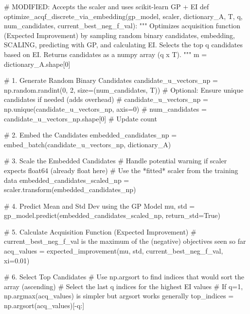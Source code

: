 \documentclass[
  letterpaper,
  DIV=11,
  numbers=noendperiod]{scrartcl}
\newenvironment{Shaded}{\begin{snugshade}}{\end{snugshade}}
\newcommand{\CommentTok}[1]{\textcolor[rgb]{0.37,0.37,0.37}{#1}}
\newcommand{\DecValTok}[1]{\textcolor[rgb]{0.68,0.00,0.00}{#1}}
\newcommand{\FloatTok}[1]{\textcolor[rgb]{0.68,0.00,0.00}{#1}}
\newcommand{\KeywordTok}[1]{\textcolor[rgb]{0.00,0.23,0.31}{#1}}
\newcommand{\NormalTok}[1]{\textcolor[rgb]{0.00,0.23,0.31}{#1}}
\newcommand{\OperatorTok}[1]{\textcolor[rgb]{0.37,0.37,0.37}{#1}}
\newcommand{\VariableTok}[1]{\textcolor[rgb]{0.07,0.07,0.07}{#1}}
\begin{document}
\begin{Shaded}
\begin{Highlighting}[]
\CommentTok{\# MODIFIED: Accepts the scaler and uses scikit{-}learn GP + EI}
\KeywordTok{def}\NormalTok{ optimize\_acqf\_discrete\_via\_embedding(gp\_model, scaler, dictionary\_A, T, q, num\_candidates, current\_best\_neg\_f\_val):}
    \CommentTok{"""}
\CommentTok{    Optimizes acquisition function (Expected Improvement) by sampling random}
\CommentTok{    binary candidates, embedding, SCALING, predicting with GP, and calculating EI.}
\CommentTok{    Selects the top q candidates based on EI.}
\CommentTok{    Returns candidates as a numpy array (q x T).}
\CommentTok{    """}
\NormalTok{    m }\OperatorTok{=}\NormalTok{ dictionary\_A.shape[}\DecValTok{0}\NormalTok{]}

    \CommentTok{\# 1. Generate Random Binary Candidates}
\NormalTok{    candidate\_u\_vectors\_np }\OperatorTok{=}\NormalTok{ np.random.randint(}\DecValTok{0}\NormalTok{, }\DecValTok{2}\NormalTok{, size}\OperatorTok{=}\NormalTok{(num\_candidates, T))}
    \CommentTok{\# Optional: Ensure unique candidates if needed (adds overhead)}
    \CommentTok{\# candidate\_u\_vectors\_np = np.unique(candidate\_u\_vectors\_np, axis=0)}
    \CommentTok{\# num\_candidates = candidate\_u\_vectors\_np.shape[0] \# Update count}

    \CommentTok{\# 2. Embed the Candidates}
\NormalTok{    embedded\_candidates\_np }\OperatorTok{=}\NormalTok{ embed\_batch(candidate\_u\_vectors\_np, dictionary\_A)}

    \CommentTok{\# 3. Scale the Embedded Candidates}
    \CommentTok{\# Handle potential warning if scaler expects float64 (already float here)}
    \CommentTok{\# Use the *fitted* scaler from the training data}
\NormalTok{    embedded\_candidates\_scaled\_np }\OperatorTok{=}\NormalTok{ scaler.transform(embedded\_candidates\_np)}

    \CommentTok{\# 4. Predict Mean and Std Dev using the GP Model}
\NormalTok{    mu, std }\OperatorTok{=}\NormalTok{ gp\_model.predict(embedded\_candidates\_scaled\_np, return\_std}\OperatorTok{=}\VariableTok{True}\NormalTok{)}

    \CommentTok{\# 5. Calculate Acquisition Function (Expected Improvement)}
    \CommentTok{\# current\_best\_neg\_f\_val is the maximum of the (negative) objectives seen so far}
\NormalTok{    acq\_values }\OperatorTok{=}\NormalTok{ expected\_improvement(mu, std, current\_best\_neg\_f\_val, xi}\OperatorTok{=}\FloatTok{0.01}\NormalTok{)}

    \CommentTok{\# 6. Select Top Candidates}
    \CommentTok{\# Use np.argsort to find indices that would sort the array (ascending)}
    \CommentTok{\# Select the last q indices for the highest EI values}
    \CommentTok{\# If q=1, np.argmax(acq\_values) is simpler but argsort works generally}
\NormalTok{    top\_indices }\OperatorTok{=}\NormalTok{ np.argsort(acq\_values)[}\OperatorTok{{-}}\NormalTok{q:]}


\end{Highlighting}
\end{Shaded}
\end{document}
